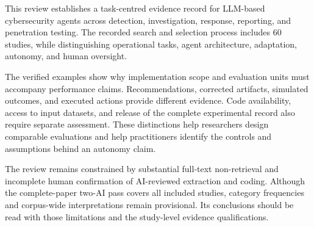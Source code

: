 This review establishes a task-centred evidence record for LLM-based cybersecurity agents across detection, investigation, response, reporting, and penetration testing. The recorded search and selection process includes 60 studies, while distinguishing operational tasks, agent architecture, adaptation, autonomy, and human oversight.

The verified examples show why implementation scope and evaluation units must accompany performance claims. Recommendations, corrected artifacts, simulated outcomes, and executed actions provide different evidence. Code availability, access to input datasets, and release of the complete experimental record also require separate assessment. These distinctions help researchers design comparable evaluations and help practitioners identify the controls and assumptions behind an autonomy claim.

The review remains constrained by substantial full-text non-retrieval and incomplete human confirmation of AI-reviewed extraction and coding. Although the complete-paper two-AI pass covers all included studies, category frequencies and corpus-wide interpretations remain provisional. Its conclusions should be read with those limitations and the study-level evidence qualifications.
